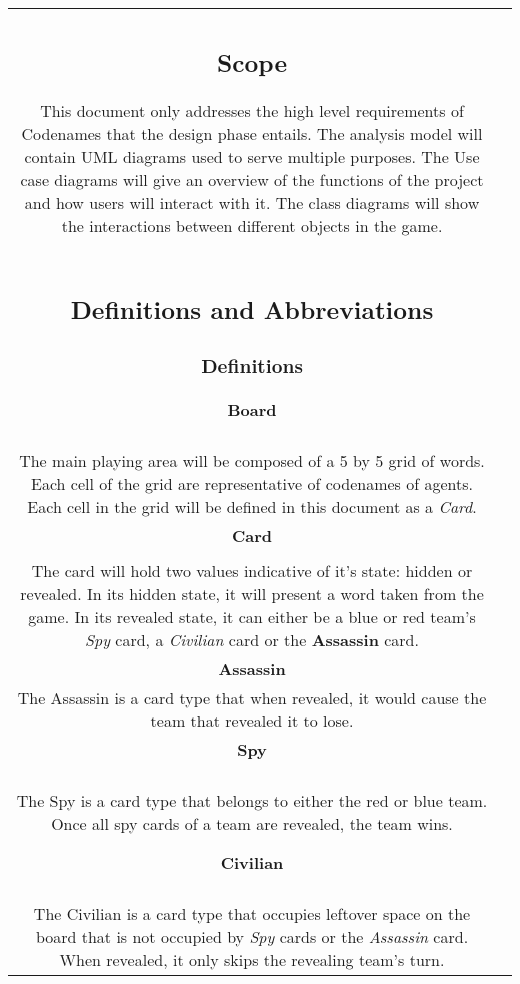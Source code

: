 \documentclass[10pt, a4paper]{article}
\begin{document}
\begin{table}[htbp]
\begin{center}
\begin{tabular}{| c | c |}
	\subsection{Scope}
	
	This document only addresses the high level requirements of Codenames  that the design phase entails. The analysis model will contain UML diagrams used to serve multiple purposes. The Use case diagrams will give an overview of the functions of the project and how users will interact with it. The class diagrams will show the interactions between different objects in the game. \\
	

	\subsection{Definitions and Abbreviations}
	
		\subsubsection{Definitions}
	
		\textbf{Board} \\
		\\
		The main playing area will be composed of a 5 by 5 grid of words. Each cell of the grid are representative of codenames of agents. Each cell in the grid will be defined in this document as a \textit{Card}.\\
	
		\textbf{Card} \\
		\\
		The card will hold two values indicative of it's state: hidden or revealed. In its hidden state, it will present a word taken from the game. In its revealed state, it can either be a blue or red team's \textit{Spy} card, a \textit{Civilian} card or the \textbf{Assassin} card.\\
		
		\textbf{Assassin} \\
		The Assassin is a card type that when revealed, it would cause the team that revealed it to lose.\\
		
		\textbf{Spy}\\
		\\
		The Spy is a card type that belongs to either the red or blue team. Once all spy cards of a team are revealed, the team wins.
		
		\textbf{Civilian}\\
		\\
		The Civilian is a card type that occupies leftover space on the board that is not occupied by \textit{Spy} cards or the \textit{Assassin} card. When revealed, it only skips the revealing team's turn. \\
	

\end{tabular}
\end{center}
\end{table}
\end{document}
